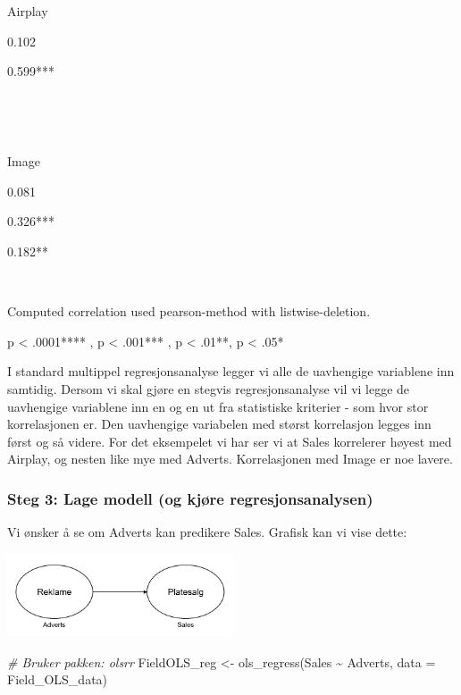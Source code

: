 \documentclass[
]{article}
\newenvironment{Shaded}{\begin{snugshade}}{\end{snugshade}}
\newcommand{\AttributeTok}[1]{\textcolor[rgb]{0.77,0.63,0.00}{#1}}
\newcommand{\CommentTok}[1]{\textcolor[rgb]{0.56,0.35,0.01}{\textit{#1}}}
\newcommand{\FunctionTok}[1]{\textcolor[rgb]{0.00,0.00,0.00}{#1}}
\newcommand{\NormalTok}[1]{#1}
\newcommand{\OtherTok}[1]{\textcolor[rgb]{0.56,0.35,0.01}{#1}}
\newcommand{\SpecialCharTok}[1]{\textcolor[rgb]{0.00,0.00,0.00}{#1}}
\begin{document}
~

~

Airplay

0.102{}

0.599***

~

~

Image

0.081{}

0.326***

0.182**

~

Computed correlation used pearson-method with listwise-deletion.

p \textless{} .0001**** , p \textless{} .001*** , p \textless{} .01**, p \textless{} .05*

I standard multippel regresjonsanalyse legger vi alle de uavhengige variablene inn samtidig. Dersom vi skal gjøre en stegvis regresjonsanalyse vil vi legge de uavhengige variablene inn en og en ut fra statistiske kriterier - som hvor stor korrelasjonen er. Den uavhengige variabelen med størst korrelasjon legges inn først og så videre. For det eksempelet vi har ser vi at Sales korrelerer høyest med Airplay, og nesten like mye med Adverts. Korrelasjonen med Image er noe lavere.

\hypertarget{steg-3-lage-modell-og-kjuxf8re-regresjonsanalysen}{%
\subsubsection{Steg 3: Lage modell (og kjøre regresjonsanalysen)}\label{steg-3-lage-modell-og-kjuxf8re-regresjonsanalysen}}

Vi ønsker å se om Adverts kan predikere Sales. Grafisk kan vi vise dette:

\includegraphics[width=0.5\textwidth,height=\textheight]{OLS1.png}

\begin{Shaded}
\begin{Highlighting}[]
\CommentTok{\# Bruker pakken: olsrr}
\NormalTok{FieldOLS\_reg }\OtherTok{\textless{}{-}} \FunctionTok{ols\_regress}\NormalTok{(Sales }\SpecialCharTok{\textasciitilde{}}\NormalTok{ Adverts, }\AttributeTok{data =}\NormalTok{ Field\_OLS\_data)}
\end{Highlighting}
\end{Shaded}
\end{document}
